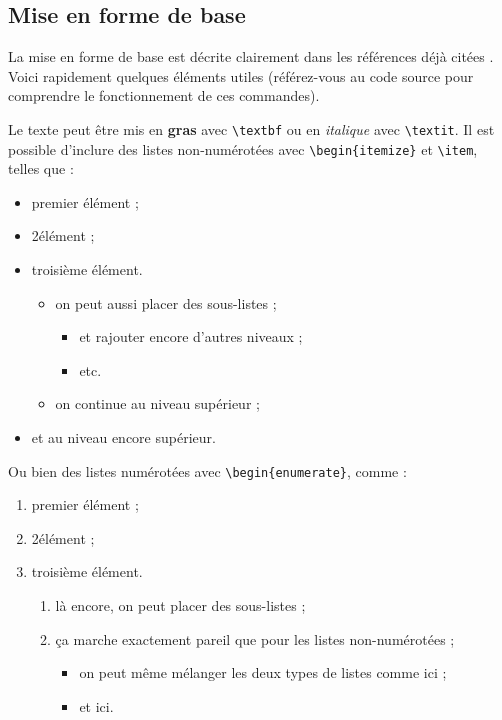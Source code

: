 \documentclass{ASD}
\begin{document}
\subsection{Mise en forme de base}
\label{sec:miseenforme}
La mise en forme de base est décrite clairement dans les références déjà citées \cite{Wikibooks2010, Wikibooks2011}. Voici rapidement quelques éléments utiles (référez-vous au code source pour comprendre le fonctionnement de ces commandes).
	
Le texte peut être mis en \textbf{gras} avec \texttt{\textbackslash{}textbf} ou en \textit{italique} avec \texttt{\textbackslash{}textit}. Il est possible d'inclure des listes non-numérotées avec \texttt{\textbackslash{}begin\{itemize\}} et \texttt{\textbackslash{}item}, telles que :	
\begin{itemize}
	\item premier élément ;
	\item 2\ieme élément ;
	\item troisième élément.
	\begin{itemize}
		\item on peut aussi placer des sous-listes ;
		\begin{itemize}
			\item et rajouter encore d'autres niveaux ;
			\item etc.
		\end{itemize}
		\item on continue au niveau supérieur ;
	\end{itemize}
	\item et au niveau encore supérieur.
\end{itemize}

Ou bien des listes numérotées avec \texttt{\textbackslash{}begin\{enumerate\}}, comme :
\begin{enumerate}
	\item premier élément ;
	\item 2\ieme élément ;
	\item troisième élément.
	\begin{enumerate}
		\item là encore, on peut placer des sous-listes ;
		\item ça marche exactement pareil que pour les listes non-numérotées ;
		\begin{itemize}
			\item on peut même mélanger les deux types de listes comme ici ;
			\item et ici.
		\end{itemize}
	\end{enumerate}
\end{enumerate}
	
\end{document}
